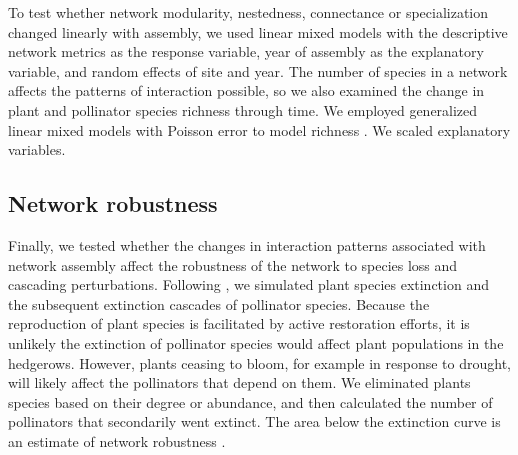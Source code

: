 \documentclass[12pt]{article}
\begin{document}
To test whether network modularity, nestedness, connectance or
specialization changed linearly with assembly, we used linear mixed
models with the descriptive network metrics as the response variable,
year of assembly as the explanatory variable, and random effects of
site and year. The number of species in a network affects the patterns
of interaction possible, so we also examined the change in plant and
pollinator species richness through time. We employed generalized
linear mixed models with Poisson error to model richness
\citep{lme4}. We scaled explanatory variables.


\subsection*{Network robustness}
Finally, we tested whether the changes in interaction patterns
associated with network assembly affect the robustness of the network
to species loss and cascading perturbations. Following
\cite{Memmott2004}, we simulated plant species extinction and the
subsequent extinction cascades of pollinator species. Because the
reproduction of plant species is facilitated by active restoration
efforts, it is unlikely the extinction of pollinator species would
affect plant populations in the hedgerows. However, plants ceasing to
bloom, for example in response to drought, will likely affect the
pollinators that depend on them. We eliminated plants species based on
their degree or abundance, and then calculated the number of
pollinators that secondarily went extinct. The area below the
extinction curve is an estimate of network robustness
\citep{Memmott2004, Burgos2007, bipartite}.
\end{document}
